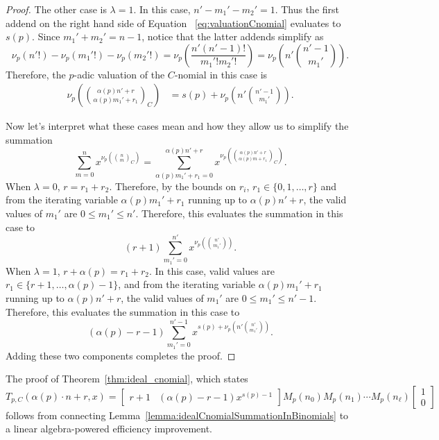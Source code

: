 \documentclass{amsart}
\theoremstyle{definition}
\begin{document}
\begin{proof}
The other case is $\lambda=1$.
In this case, $n'-m_1'-m_2'=1$. Thus the first addend on the right hand side of Equation ~\eqref{eq:valuationCnomial} evaluates to $s(p)$. Since $m_1'+m_2'=n-1$, notice that the latter addends simplify as 
$$\nu_p\left(n'!\right) - \nu_p\left(m_1'!\right) - \nu_p\left(m_2'!\right)= \nu_p\left(\frac{n' (n'-1)!}{m_1'! m_2'!}\right)= \nu_p\!\left(n'\binom {n'-1} {m_1'}\right).$$
Therefore, the $p$-adic valuation of the $C$-nomial in this case is
\begin{align*}
    \nu_p\!\left(\binom{\alpha(p)n'+r}{\alpha(p)m_1'+r_1}_C\right) &= s(p)+\nu_p\!\left(n'\binom{n'-1}{m_1'}\right).
\end{align*}

Now let's interpret what these cases mean and how they allow us to simplify the summation 
$$\sum_{m=0}^{n} x^{\nu_p\!\left( \binom{n}{m}_C \right)} = \sum_{\alpha(p)m_1'+r_1=0}^{\alpha(p)n'+r} x^{\nu_p\!\left(\binom{\alpha(p)n'+r}{\alpha(p)m+r_1}_C\right)}. $$ 
When $\lambda=0$, $r=r_1+r_2$. Therefore, by the bounds on $r_i$, $r_1\in\{0,1,\ldots,r\}$ and from the iterating variable $\alpha(p)m_1' + r_1$ running up to $\alpha(p)n'+r$, the valid values of $m_1'$ are $0 \leq m_1' \leq n'$. Therefore, this evaluates the summation in this case to $$(r+1)\sum_{m_1'=0}^{n'} x^{\nu_p\!\left(\binom{n'}{m_1'}\right)}.$$
When $\lambda=1$, $r+\alpha(p)=r_1+r_2$. In this case, valid values are $r_1\in\{r+1, \ldots,\alpha(p)-1\}$, and from the iterating variable $\alpha(p)m_1' + r_1$ running up to $\alpha(p)n'+r$, the valid values of $m_1'$ are $0 \leq m_1' \leq n'-1$. Therefore, this evaluates the summation in this case to $$(\alpha(p)-r-1)\sum_{m_1'=0}^{n'-1} x^{s(p)+\nu_p\!\left(n'\binom{n'}{m_1'}\right)}.$$
Adding these two components completes the proof.
\end{proof}

The proof of Theorem~\ref{thm:ideal_cnomial}, which states \[
T_{p,C}(\alpha(p) \cdot n + r, x)
= \begin{bmatrix}
    r+1&(\alpha(p) - r - 1)x^{s(p) - 1}
\end{bmatrix} M_p(n_0) M_p(n_1) \cdots M_p(n_\ell) \begin{bmatrix} 1 \\ 0 \end{bmatrix}
\] follows from connecting Lemma~\ref{lemma:idealCnomialSummationInBinomials} to a linear algebra-powered efficiency improvement.
\end{document}
